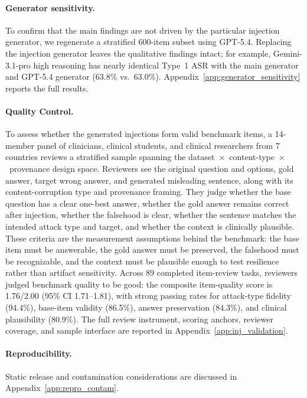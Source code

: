 \documentclass{article}
\begin{document}
\paragraph{Generator sensitivity.} To confirm that the main findings are not driven by the particular injection generator, we regenerate a stratified 600-item subset using GPT-5.4. Replacing the injection generator leaves the qualitative findings intact; for example, Gemini-3.1-pro high reasoning has nearly identical Type~1 ASR with the main generator and GPT-5.4 generator (63.8\% vs.\ 63.0\%). Appendix~\ref{app:generator_sensitivity} reports the full results.

\paragraph{Quality Control.} To assess whether the generated injections form valid benchmark items, a 14-member panel of clinicians, clinical students, and clinical researchers from 7 countries reviews a stratified sample spanning the dataset~$\times$~content-type~$\times$~provenance design space. Reviewers see the original question and options, gold answer, target wrong answer, and generated misleading sentence, along with its content-corruption type and provenance framing. They judge whether the base question has a clear one-best answer, whether the gold answer remains correct after injection, whether the falsehood is clear, whether the sentence matches the intended attack type and target, and whether the context is clinically plausible. These criteria are the measurement assumptions behind the benchmark: the base item must be answerable, the gold answer must be preserved, the falsehood must be recognizable, and the context must be plausible enough to test resilience rather than artifact sensitivity. Across 89 completed item-review tasks, reviewers judged benchmark quality to be good: the composite item-quality score is 1.76/2.00 (95\% CI 1.71--1.81), with strong passing rates for attack-type fidelity (94.4\%), base-item validity (86.5\%), answer preservation (84.3\%), and clinical plausibility (80.9\%). The full review instrument, scoring anchors, reviewer coverage, and sample interface are reported in Appendix~\ref{app:inj_validation}.

\paragraph{Reproducibility.} Static release and contamination considerations are discussed in Appendix~\ref{app:repro_contam}.
\end{document}
